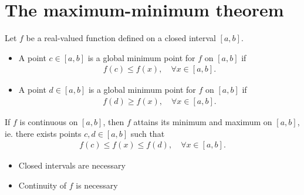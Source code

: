 \documentclass{report}
\begin{document}
\section{The maximum-minimum theorem}

	Let $f$ be a real-valued function defined on a closed interval $[a,b]$.
	\begin{itemize}
		\item A point $c \in [a,b]$ is a global minimum point for $f$ on $[a,b]$ if
			\begin{align*}
				f(c) \leq f(x), \quad \forall x \in [a,b].
			\end{align*}
		\item A point $d \in [a,b]$ is a global minimum point for $f$ on $[a,b]$ if
			\begin{align*}
				f(d) \geq f(x), \quad \forall x \in [a,b].
			\end{align*}
	\end{itemize}

	If $f$ is continuous on $[a,b]$, then $f$ attains its minimum and maximum on $[a,b]$, ie. there exists points $c,d \in [a,b]$ such that
		\begin{align*}
			f(c) \leq f(x) \leq f(d), \quad \forall x \in [a,b].
		\end{align*}

	\begin{itemize}
		\item Closed intervals are necessary
		\item Continuity of $f$ is necessary
	\end{itemize}
\end{document}
